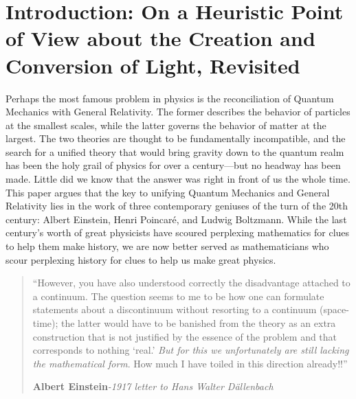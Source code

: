 \documentclass{article}
\begin{document}
\section*{Introduction: On a Heuristic Point of View about the Creation and Conversion of Light, Revisited}
Perhaps the most famous problem in physics is the reconciliation of Quantum Mechanics with General Relativity. The former describes the behavior of particles at the smallest scales, while the latter governs the behavior of matter at the largest. The two theories are thought to be fundamentally incompatible, and the search for a unified theory that would bring gravity down to the quantum realm has been the holy grail of physics for over a century—but no headway has been made. Little did we know that the answer was right in front of us the whole time. This paper argues that the key to unifying Quantum Mechanics and General Relativity lies in the work of three contemporary geniuses of the turn of the 20th century: Albert Einstein, Henri Poincar\'e, and Ludwig Boltzmann. While the last century's worth of great physicists have scoured perplexing mathematics for clues to help them make history, we are now better served as mathematicians who scour perplexing history for clues to help us make great physics.

\begin{quote}
    “However, you have also understood correctly the disadvantage attached to a continuum. The question seems to me to be how one can formulate statements about a discontinuum without resorting to a continuum (space-time); the latter would have to be banished from the theory as an extra construction that is not justified by the essence of the problem and that corresponds to nothing ‘real.’ \textit{But for this we unfortunately are still lacking the mathematical form}. How much I have toiled in this direction already!!”

    \textbf{Albert Einstein}\textit{-1917 letter to Hans Walter Dällenbach}\cite{Einstein314}
    \end{quote}
\end{document}
